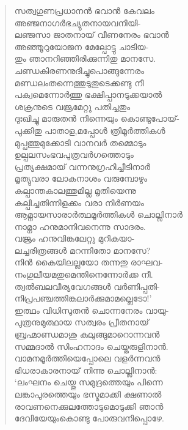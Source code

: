 \begin{verse}
സത്വഗുണപ്രധാനന്‍ ഭവാന്‍ കേവലം\\
അഞ്ജനാഗര്‍ഭച്യുതനായവനിയി-\\
ലഞ്ജസാ ജാതനായ് വീണനേരം ഭവാന്‍\\
അഞ്ഞൂറുയോജന മേല്പോട്ടു ചാടിയ-\\
തും ഞാനറിഞ്ഞിരിക്കുന്നിതു മാനസേ.\\
ചണ്ഡകിരണനുദിച്ചുപൊങ്ങുന്നേരം\\
മണ്ഡലംതന്നെത്തുടുതുടെക്കണ്ടു നീ\\
പക്വമെന്നോര്‍ത്തു ഭക്ഷിപ്പാനടുക്കയാല്‍\\
ശക്രനുടെ വജ്രമേറ്റു പതിച്ചതും\\
ദുഃഖിച്ചു മാരുതന്‍ നിന്നെയും കൊണ്ടുപോയ്-\\
പുക്കിതു പാതാള,മപ്പോള്‍ ത്രിമൂര്‍ത്തികള്‍\\
മുപ്പത്തുമുക്കോടി വാനവര്‍ തമ്മൊടും\\
ഉല്പലസംഭവപുത്രവര്‍ഗത്തൊടും\\
പ്രത്യക്ഷമായ് വന്നനുഗ്രഹിച്ചീടിനാര്‍\\
മൃത്യുവരാ ലോകനാശം വരുമ്പോഴും\\
കല്പാന്തകാലത്തുമില്ല മൃതിയെന്നു\\
കല്പിച്ചതിന്നിളക്കം വരാ നിര്‍ണയം\\
ആമ്നായസാരാര്‍ത്ഥമൂര്‍ത്തികള്‍ ചൊല്ലിനാര്‍\\
നാമ്നാ ഹനുമാനിവനെന്നു സാദരം.\\
വജ്രം ഹനുവിങ്കലേറ്റു മുറികയാ-\\
ലച്ചരിത്രങ്ങള്‍ മറന്നിതോ മാനസേ?\\
നിന്‍ കൈയിലല്ലയോ തന്നതു രാഘവ-\\
നംഗുലീയമതുമെന്തിനെന്നോര്‍ക്ക നീ.\\
ത്വല്‍ബലവീര്യവേഗങ്ങള്‍ വര്‍ണിപ്പതി-\\
നിപ്രപഞ്ചത്തിങ്കലാര്‍ക്കുമാമല്ലെടോ!’\\
ഇത്ഥം വിധിസുതന്‍ ചൊന്നനേരം വായു-\\
പുത്രനുമുത്ഥായ സത്വരം പ്രീതനായ്\\
ബ്രഹ്മാണ്ഡമാശു കുലുങ്ങുമാറൊന്നവന്‍\\
സമ്മദാല്‍ സിംഹനാദം ചെയ്തരുളിനാന്‍.\\
വാമനമൂര്‍ത്തിയെപ്പോലെ വളര്‍ന്നവന്‍\\
ഭിധരാകാരനായ് നിന്നു ചൊല്ലിനാന്‍:\\
‘ലംഘനം ചെയ്തു സമുദ്രത്തെയും പിന്നെ\\
ലങ്കാപുരത്തെയും ഭസ്മമാക്കി ക്ഷണാല്‍\\
രാവണനെക്കുലത്തോടുമൊടുക്കി ഞാന്‍\\
ദേവിയേയുംകൊണ്ടു പോരുവനിപ്പൊഴേ.\\

\end{verse}

